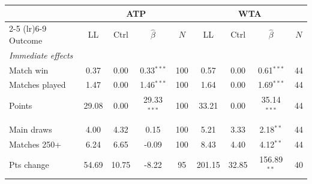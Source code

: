 \begin{tabular}{l cccc cccc}
\toprule
 & \multicolumn{4}{c}{ATP} & \multicolumn{4}{c}{WTA} \\
\cmidrule(lr){2-5} \cmidrule(lr){6-9}
Outcome & LL & Ctrl & $\hat{\beta}$ & $N$ & LL & Ctrl & $\hat{\beta}$ & $N$ \\
\midrule
\multicolumn{9}{l}{\textit{Immediate effects}} \\
\quad Match win & 0.37 & 0.00 & 0.33$^{***}$ & 100 & 0.57 & 0.00 & 0.61$^{***}$ & 44 \\
\quad Matches played & 1.47 & 0.00 & 1.46$^{***}$ & 100 & 1.64 & 0.00 & 1.69$^{***}$ & 44 \\
\quad Points & 29.08 & 0.00 & 29.33$^{***}$ & 100 & 33.21 & 0.00 & 35.14$^{***}$ & 44 \\
\addlinespace
\multicolumn{9}{l}{\textit{Post-episode dynamics (26w)}} \\
\quad Main draws & 4.00 & 4.32 & 0.15 & 100 & 5.21 & 3.33 & 2.18$^{**}$ & 44 \\
\quad Matches 250+ & 6.24 & 6.65 & -0.09 & 100 & 8.43 & 4.40 & 4.12$^{**}$ & 44 \\
\quad Pts change & 54.69 & 10.75 & -8.22 & 95 & 201.15 & 32.85 & 156.89$^{**}$ & 40 \\
\bottomrule
\end{tabular}
